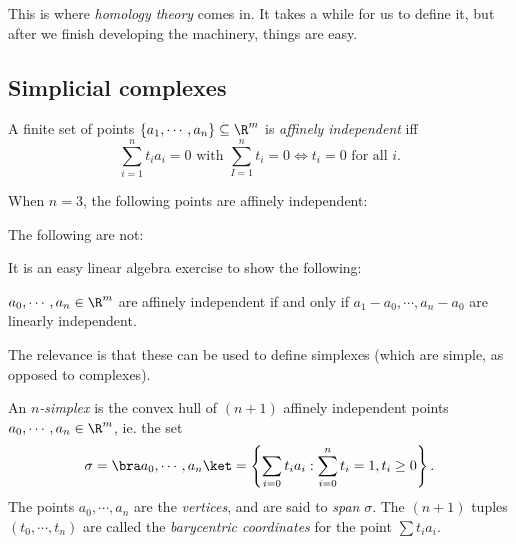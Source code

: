 \documentclass[a4paper]{article}
\begin{document}
This is where \emph{homology theory} comes in. It takes a while for us to define it, but after we finish developing the machinery, things are easy.
\subsection{Simplicial complexes}
\begin{defi}
  A finite set of points $\{a_1, \cdots, a_n\} \subseteq \R^m$ is \emph{affinely independent} iff
  \[
    \sum_{i = 1}^n t_i a_i = 0 \text{ with } \sum_{I = 1}^n t_i = 0 \Leftrightarrow t_i = 0\text{ for all }i.
  \]
\end{defi}

\begin{eg}
  When $n = 3$, the following points are affinely independent:
  \begin{center}
  \end{center}
  The following are not:
  \begin{center}
  \end{center}
\end{eg}

It is an easy linear algebra exercise to show the following:
\begin{lemma}
  $a_0, \cdots, a_n \in \R^m$ are affinely independent if and only if $a_1 - a_0, \cdots, a_n - a_0$ are linearly independent.
\end{lemma}

The relevance is that these can be used to define simplexes (which are simple, as opposed to complexes).
\begin{defi}[$n$-simplex]
  An \emph{$n$-simplex} is the convex hull of $(n + 1)$ affinely independent points $a_0, \cdots, a_n \in \R^m$, ie. the set
  \[
    \sigma = \bra a_0, \cdots, a_n\ket = \left\{\sum_{i = 0} t_i a_i : \sum_{i = 0}^n t_i = 1,t_i \geq 0\right\}.
  \]
  The points $a_0, \cdots, a_n$ are the \emph{vertices}, and are said to \emph{span} $\sigma$. The $(n + 1)$ tuples $(t_0, \cdots, t_n)$ are called the \emph{barycentric coordinates} for the point $\sum t_i a_i$.
\end{defi}
\end{document}

